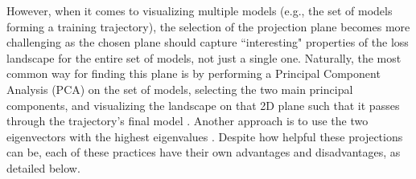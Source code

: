 \documentclass[letterpaper]{article} %
\begin{document}
            However, when it comes to visualizing multiple models (e.g., the set of models forming a training trajectory), the selection of the projection plane becomes more challenging as the chosen plane should capture ``interesting" properties of the loss landscape for the entire set of models, not just a single one. Naturally, the most common way for finding this plane is by performing a Principal Component Analysis (PCA) on the set of models, selecting the two main principal components, and visualizing the landscape on that 2D plane such that it passes through the trajectory's final model \cite{NIPS2018_7875}. 
            Another approach is to use the two eigenvectors with the highest eigenvalues \cite{chatzimichailidis2019gradvis, pyhessian}. 
   Despite how helpful these projections can be, each of these practices have their own advantages and disadvantages, as detailed below.
\end{document}
